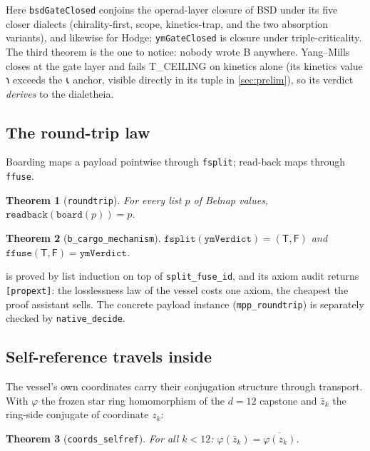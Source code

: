 \documentclass[12pt,a4paper]{article}
\newtheorem{theorem}{Theorem}[section]
\newcommand{\shav}[1]{{\shavfont #1}}
\newcommand{\bT}{\textsf{T}}
\newcommand{\bF}{\textsf{F}}
\newcommand{\bB}{\textsf{B}}
\begin{document}
Here \texttt{bsdGateClosed} conjoins the operad-layer closure of BSD under
its five closer dialects (chirality-first, scope, kinetics-trap, and the
two absorption variants), and likewise for Hodge; \texttt{ymGateClosed} is
closure under triple-criticality. The third theorem is the one to notice:
nobody wrote \bB{} anywhere. Yang--Mills closes at the gate layer and
fails T\_CEILING on kinetics alone (its kinetics value \shav{𐑪} exceeds the
\shav{𐑧} anchor, visible directly in its tuple in \cref{sec:prelim}), so
its verdict \emph{derives} to the dialetheia.

\subsection{The round-trip law}

Boarding maps a payload pointwise through \texttt{fsplit}; read-back maps
through \texttt{ffuse}.

\begin{theorem}[\texttt{roundtrip}]
\label{thm:roundtrip}
For every list $p$ of Belnap values,
$\texttt{readback}(\texttt{board}(p)) = p$.
\end{theorem}

\begin{theorem}[\texttt{b\_cargo\_mechanism}]
$\texttt{fsplit}(\texttt{ymVerdict}) = (\bT, \bF)$ and
$\texttt{ffuse}(\bT, \bF) = \texttt{ymVerdict}$.
\end{theorem}

 is proved by list induction on top of
\texttt{split\_fuse\_id}, and its axiom audit returns
\texttt{[propext]}: the losslessness law of the vessel costs one axiom,
the cheapest the proof assistant sells. The concrete payload instance
(\texttt{mpp\_roundtrip}) is separately checked by \texttt{native\_decide}.

\subsection{Self-reference travels inside}

The vessel's own coordinates carry their conjugation structure through
transport. With $\varphi$ the frozen star ring homomorphism of the $d=12$
capstone and $\bar{z}_k$ the ring-side conjugate of coordinate $z_k$:

\begin{theorem}[\texttt{coords\_selfref}]
For all $k < 12$: $\varphi(\bar{z}_k) = \overline{\varphi(z_k)}$.
\end{theorem}
\end{document}
